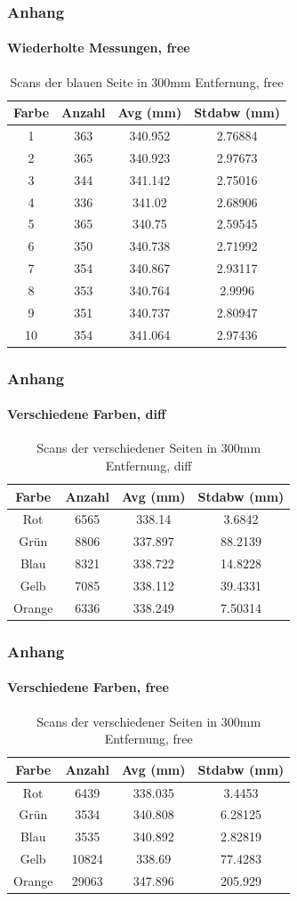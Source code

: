 \documentclass[xcolor=dvipsnames]{beamer}
\begin{document}
\begin{frame}[noframenumbering]
	\frametitle{Anhang}
	\framesubtitle{Wiederholte Messungen, free}
	\begin{table}
		\begin{tabular}{c|c|c|c}
			Farbe & Anzahl & Avg (mm) & Stdabw (mm) \\
			\hline
			1 & 363 & 340.952 & 2.76884 \\
			2 & 365 & 340.923 & 2.97673 \\
			3 & 344 & 341.142 & 2.75016 \\
			4 & 336 & 341.02 & 2.68906 \\
			5 & 365 & 340.75 & 2.59545 \\
			6 & 350 & 340.738 & 2.71992 \\
			7 & 354 & 340.867 & 2.93117 \\
			8 & 353 & 340.764 & 2.9996 \\
			9 & 351 & 340.737 & 2.80947 \\
			10 & 354 & 341.064 & 2.97436 \\
		\end{tabular}
		\caption{Scans der blauen Seite in 300mm Entfernung, free}
	\end{table}
\end{frame}


\begin{frame}[noframenumbering]
	\frametitle{Anhang}
	\framesubtitle{Verschiedene Farben, diff}
	\begin{table}
		\begin{tabular}{c|c|c|c}
			Farbe & Anzahl & Avg (mm) & Stdabw (mm) \\
			\hline
			Rot & 6565 & 338.14 & 3.6842 \\
			Gr\"un & 8806 & 337.897 & 88.2139 \\
			Blau & 8321 & 338.722 & 14.8228 \\
			Gelb & 7085 & 338.112 & 39.4331 \\
			Orange & 6336 & 338.249 & 7.50314 \\
		\end{tabular}
		\caption{Scans der verschiedener Seiten in 300mm Entfernung, diff}
	\end{table}
\end{frame}


\begin{frame}[noframenumbering]
	\frametitle{Anhang}
	\framesubtitle{Verschiedene Farben, free}
	\begin{table}
		\begin{tabular}{c|c|c|c}
			Farbe & Anzahl & Avg (mm) & Stdabw (mm) \\
			\hline
			Rot & 6439 & 338.035 & 3.4453 \\
			Gr\"un & 3534 & 340.808 & 6.28125 \\
			Blau & 3535 & 340.892 & 2.82819 \\
			Gelb & 10824 & 338.69 & 77.4283 \\
			Orange & 29063 & 347.896 & 205.929 \\
		\end{tabular}
		\caption{Scans der verschiedener Seiten in 300mm Entfernung, free}
	\end{table}
\end{frame}
\end{document}
